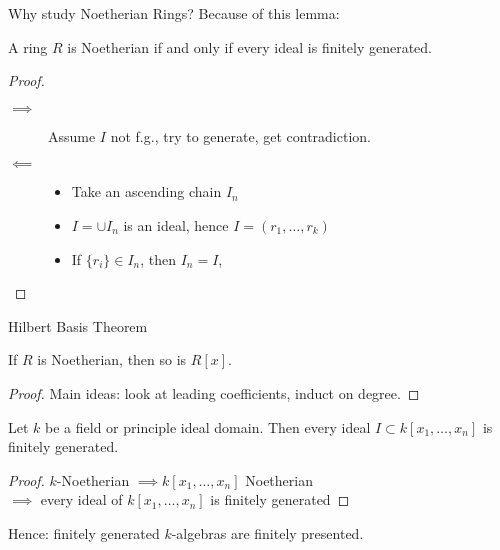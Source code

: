 \documentclass{beamer}
\begin{document}
  \begin{frame}{Why study Noetherian Rings?}
    Because of this lemma:
    \begin{lemma} A ring $R$ is Noetherian if and only if every ideal is finitely generated.\end{lemma}
    \begin{proof}
      \begin{description}
      \item[$\implies$] Assume $I$ not f.g., try to generate, get contradiction.
      \item[$\impliedby$] \begin{itemize}
      \item Take an ascending chain $I_n$
      \item $I=\cup I_n$ is an ideal, hence $I=(r_1,\dots, r_k)$
      \item If $\{r_i\}\in I_n$, then $I_n=I$,
        \end{itemize}
        \end{description}

      \end{proof}
   
    \end{frame}

  \begin{frame}{Hilbert Basis Theorem}
    \begin{theorem} If $R$ is Noetherian, then so is $R[x]$.
    \end{theorem}
    \begin{proof}Main ideas: look at leading coefficients, induct on degree.
      \end{proof}
    \begin{corollary} Let $k$ be a field or principle ideal domain.  Then every ideal $I\subset k[x_1,\dots, x_n]$ is finitely generated.
    \end{corollary}
    \begin{proof} $k$-Noetherian $\implies k[x_1,\dots, x_n]$ Noetherian \\ $\implies$ every ideal of $k[x_1,\dots, x_n]$ is finitely generated
        \end{proof}
    \begin{block}{Hence: finitely generated $k$-algebras are finitely presented.}
      \end{block}
\end{frame}  
\end{document}
